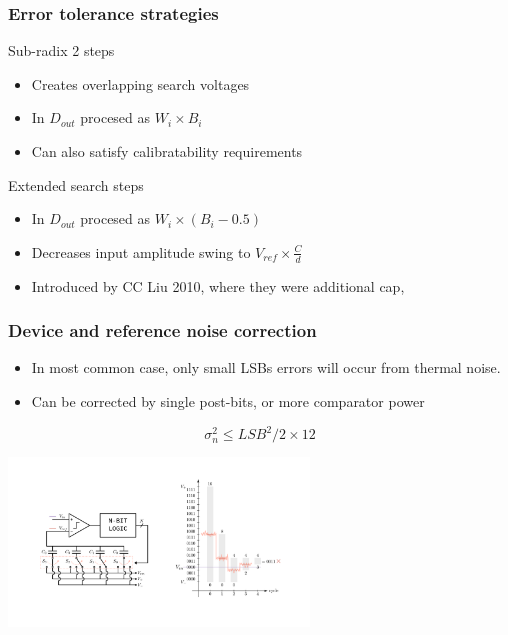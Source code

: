 \documentclass[aspectratio=169]{beamer}
\begin{document}

\begin{frame}
  \frametitle{Error tolerance strategies}
  Sub-radix 2 steps
  \begin{itemize}
    \item Creates overlapping search voltages
    \item In $D_{out}$ procesed as $W_i \times B_i$
    \item Can also satisfy calibratability requirements
  \end{itemize}
  Extended search steps
  \begin{itemize}
    \item In $D_{out}$ procesed as $W_i \times (B_i-0.5)$
    \item Decreases input amplitude swing to $V_{ref} \times \frac{C}{d}$
    \item Introduced by CC Liu 2010, where they were additional cap, 
  \end{itemize}
  \end{frame}



\begin{frame}
\frametitle{Device and reference noise correction}
\begin{itemize}
  \item In most common case, only small LSBs errors will occur from thermal noise.
  \item Can be corrected by single post-bits, or more comparator power
\end{itemize}
\begin{equation*}
\sigma_n^2 \leq LSB^2 / 2 \times 12
\end{equation*}
\begin{center}
\includegraphics[width=0.6\textwidth]{tranchar3.pdf}
\end{center}
\end{frame}
\end{document}
